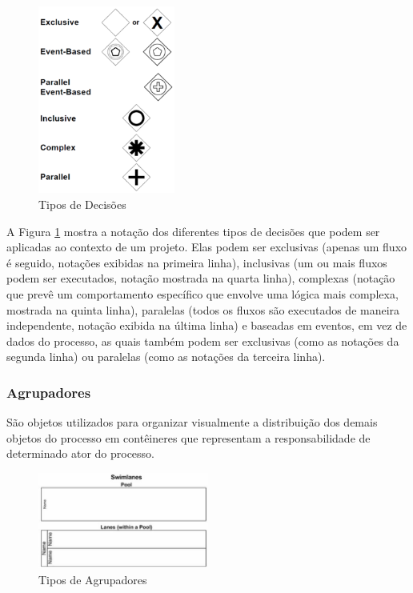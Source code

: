 \begin{enumerate}
    \begin{figure}[H]
    \centering
    \includegraphics[width=0.4\textwidth]{imagens/bpmn_gateways.png}
    \caption{Tipos de Decisões\cite{tipos_decisoes}}
    \label{fig:bpmn_gateways}
    \end{figure}
\end{enumerate}

    A Figura \ref{fig:bpmn_gateways} mostra a notação dos diferentes tipos de decisões que podem ser aplicadas ao contexto de um projeto. Elas podem ser exclusivas (apenas um fluxo é seguido, notações exibidas na primeira linha), inclusivas (um ou mais fluxos podem ser executados, notação mostrada na quarta linha), complexas (notação que prevê um comportamento específico que envolve uma lógica mais complexa, mostrada na quinta linha), paralelas (todos os fluxos são executados de maneira independente, notação exibida na última linha) e baseadas em eventos, em vez de dados do processo, as quais também podem ser exclusivas (como as notações da segunda linha) ou paralelas (como as notações da terceira linha).


\subsubsection{Agrupadores}\label{sec:bpm-bpmn_objetos_agrupadores}

    São objetos utilizados para organizar visualmente a distribuição dos demais objetos do processo em contêineres que representam a responsabilidade de determinado ator do processo.

    \begin{figure}[H]
    \centering
    \includegraphics[width=0.5\textwidth]{imagens/bpmn_swimlanes.jpg}
    \caption{Tipos de Agrupadores\cite{tipos_agrupadores}}
    \label{fig:bpmn_swimlanes}
    \end{figure}
    
